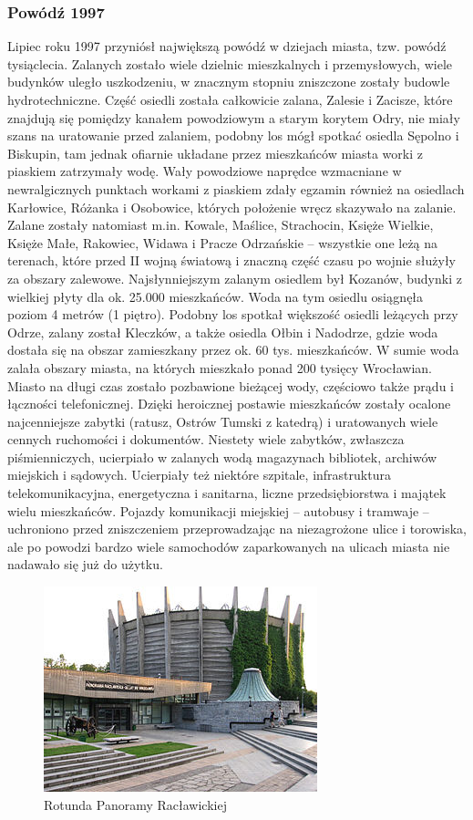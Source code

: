 \documentclass{article}
\begin{document}
\subsubsection{Powódź 1997}
Lipiec roku 1997 przyniósł największą powódź w dziejach miasta, tzw. powódź tysiąclecia. Zalanych zostało wiele dzielnic mieszkalnych i przemysłowych, wiele budynków uległo uszkodzeniu, w znacznym stopniu zniszczone zostały budowle hydrotechniczne. Część osiedli została całkowicie zalana, Zalesie i Zacisze, które znajdują się pomiędzy kanałem powodziowym a starym korytem Odry, nie miały szans na uratowanie przed zalaniem, podobny los mógł spotkać osiedla Sępolno i Biskupin, tam jednak ofiarnie układane przez mieszkańców miasta worki z piaskiem zatrzymały wodę. Wały powodziowe naprędce wzmacniane w newralgicznych punktach workami z piaskiem zdały egzamin również na osiedlach Karłowice, Różanka i Osobowice, których położenie wręcz skazywało na zalanie. Zalane zostały natomiast m.in. Kowale, Maślice, Strachocin, Księże Wielkie, Księże Małe, Rakowiec, Widawa i Pracze Odrzańskie – wszystkie one leżą na terenach, które przed II wojną światową i znaczną część czasu po wojnie służyły za obszary zalewowe. Najsłynniejszym zalanym osiedlem był Kozanów, budynki z wielkiej płyty dla ok. 25.000 mieszkańców. Woda na tym osiedlu osiągnęła poziom 4 metrów (1 piętro). Podobny los spotkał większość osiedli leżących przy Odrze, zalany został Kleczków, a także osiedla Ołbin i Nadodrze, gdzie woda dostała się na obszar zamieszkany przez ok. 60 tys. mieszkańców. W sumie woda zalała obszary miasta, na których mieszkało ponad 200 tysięcy Wrocławian. Miasto na długi czas zostało pozbawione bieżącej wody, częściowo także prądu i łączności telefonicznej. Dzięki heroicznej postawie mieszkańców zostały ocalone najcenniejsze zabytki (ratusz, Ostrów Tumski z katedrą) i uratowanych wiele cennych ruchomości i dokumentów. Niestety wiele zabytków, zwłaszcza piśmienniczych, ucierpiało w zalanych wodą magazynach bibliotek, archiwów miejskich i sądowych. Ucierpiały też niektóre szpitale, infrastruktura telekomunikacyjna, energetyczna i sanitarna, liczne przedsiębiorstwa i majątek wielu mieszkańców. Pojazdy komunikacji miejskiej – autobusy i tramwaje – uchroniono przed zniszczeniem przeprowadzając na niezagrożone ulice i torowiska, ale po powodzi bardzo wiele samochodów zaparkowanych na ulicach miasta nie nadawało się już do użytku.
\bigskip
\newline
\begin{figure}[h]
\centering
\includegraphics[scale=0.8]{20.jpg}
\caption{Rotunda Panoramy Racławickiej}
\end{figure}
\end{document}
